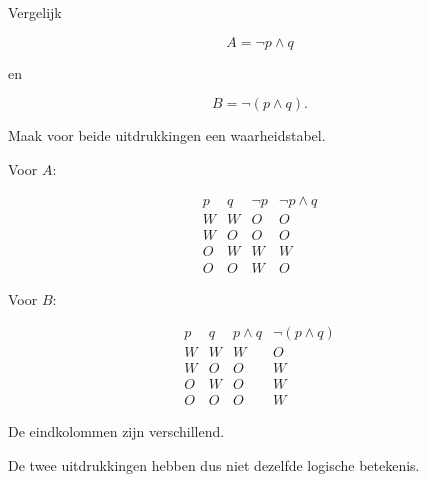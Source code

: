 \documentclass{ximera}
\begin{document}





\begin{oefening}{\oefU \ESS}

Vergelijk

\[
A=\neg p\land q
\]

en

\[
B=\neg(p\land q).
\]

Maak voor beide uitdrukkingen een waarheidstabel.

\begin{oplossing}

Voor $A$:

\[
\begin{array}{c|c|c|c}
p&q&\neg p&\neg p\land q\\
\hline
W&W&O&O\\
W&O&O&O\\
O&W&W&W\\
O&O&W&O
\end{array}
\]

Voor $B$:

\[
\begin{array}{c|c|c|c}
p&q&p\land q&\neg(p\land q)\\
\hline
W&W&W&O\\
W&O&O&W\\
O&W&O&W\\
O&O&O&W
\end{array}
\]

De eindkolommen zijn verschillend.

De twee uitdrukkingen hebben dus niet dezelfde logische betekenis.

\end{oplossing}

\end{oefening}
\end{document}
